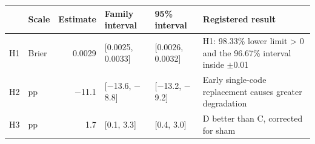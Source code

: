 \begin{tabular}{llrll p{3.3cm}}
\toprule
 & Scale & Estimate & Family interval & 95\% interval & Registered result \\
\midrule
H1 & Brier & 0.0029 & [0.0025, 0.0033] & [0.0026, 0.0032] & H1: 98.33\% lower limit > 0 and the 96.67\% interval inside $\pm$0.01 \\
H2 & pp & \ensuremath{-}11.1 & [\ensuremath{-}13.6, \ensuremath{-}8.8] & [\ensuremath{-}13.2, \ensuremath{-}9.2] & Early single-code replacement causes greater degradation \\
H3 & pp & 1.7 & [0.1, 3.3] & [0.4, 3.0] & D better than C, corrected for sham \\
\bottomrule
\end{tabular}
